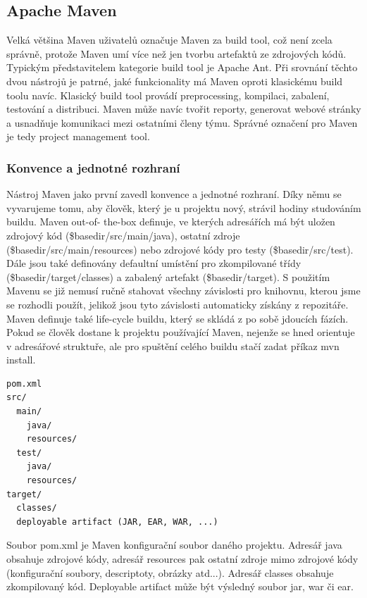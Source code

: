 \documentclass[11pt,twoside,a4paper]{book}
\begin{document}
\subsection{Apache Maven}

Velká většina Maven uživatelů označuje Maven za build tool, což není zcela správně, protože
Maven umí více než jen tvorbu artefaktů ze zdrojových kódů. Typickým představitelem
kategorie build tool je Apache Ant. Při srovnání těchto dvou nástrojů je patrné, jaké
funkcionality má Maven oproti klasickému build toolu navíc. Klasický build tool provádí
preprocessing, kompilaci, zabalení, testování a distribuci. Maven může navíc tvořit reporty,
generovat webové stránky a usnadňuje komunikaci mezi ostatními členy týmu. Správné
označení pro Maven je tedy project management tool.

\subsubsection{Konvence a jednotné rozhraní}

Nástroj Maven jako první zavedl konvence a jednotné rozhraní. Díky němu se vyvarujeme
tomu, aby člověk, který je u projektu nový, strávil hodiny studováním buildu. Maven out-of-
the-box definuje, ve kterých adresářích má být uložen zdrojový kód
(\${basedir}/src/main/java), ostatní zdroje (\${basedir}/src/main/resources)
nebo zdrojové kódy pro testy (\${basedir}/src/test). Dále jsou také definovány
defaultní umístění pro zkompilované třídy (\${basedir}/target/classes) a zabalený artefakt
(\${basedir}/target). S použitím Mavenu se již nemusí ručně stahovat všechny
závislosti pro knihovnu, kterou jsme se rozhodli použít, jelikož jsou tyto závislosti automaticky získány z repozitáře. Maven
definuje také life-cycle buildu, který se skládá z po sobě jdoucích fázích. Pokud se člověk
dostane k projektu používající Maven, nejenže se hned orientuje v adresářové struktuře, ale
pro spuštění celého buildu stačí zadat příkaz mvn install.

\begin{lstlisting}[frame=single, caption={A listing}] 
pom.xml
src/
  main/
    java/
    resources/
  test/
    java/
    resources/
target/
  classes/
  deployable artifact (JAR, EAR, WAR, ...)
\end{lstlisting}

Soubor pom.xml je Maven konfigurační soubor daného projektu. Adresář java obsahuje
zdrojové kódy, adresář resources pak ostatní zdroje mimo zdrojové kódy (konfigurační
soubory, descriptoty, obrázky atd...). Adresář classes obsahuje zkompilovaný kód. Deployable
artifact může být výsledný soubor jar, war či ear.
\end{document}
